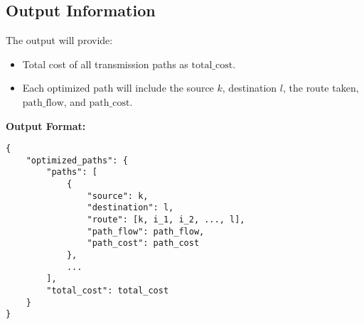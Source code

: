\documentclass{article}
\begin{document}
\subsection*{Output Information}
The output will provide:
\begin{itemize}
    \item Total cost of all transmission paths as \( \text{total\_cost} \).
    \item Each optimized path will include the source \( k \), destination \( l \), the route taken, \( \text{path\_flow} \), and \( \text{path\_cost} \).
\end{itemize}

\textbf{Output Format:}
\begin{verbatim}
{
    "optimized_paths": {
        "paths": [
            {
                "source": k,
                "destination": l,
                "route": [k, i_1, i_2, ..., l],
                "path_flow": path_flow,
                "path_cost": path_cost
            },
            ...
        ],
        "total_cost": total_cost
    }
}
\end{verbatim}
\end{document}
